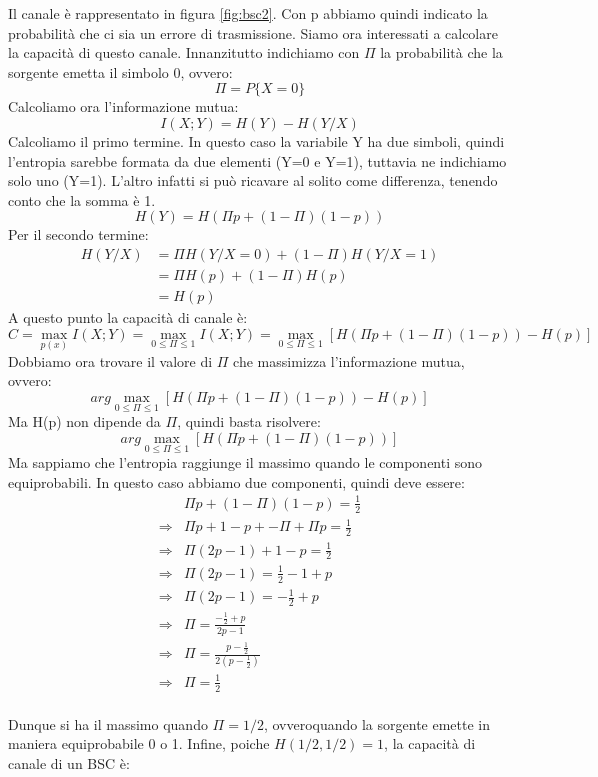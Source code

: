 Il canale è rappresentato in figura \ref{fig:bsc2}. Con p abbiamo quindi indicato la probabilità che ci sia un errore di trasmissione.
Siamo ora interessati a calcolare la capacità di questo canale.
Innanzitutto indichiamo con $\Pi$ la probabilità che la sorgente emetta il simbolo 0, ovvero:
\[
 \Pi=P\{X=0\}
\]
Calcoliamo ora l'informazione mutua:
\[
 I(X;Y)=H(Y)-H(Y/X)
\]
Calcoliamo il primo termine. In questo caso la variabile Y ha due simboli, quindi l'entropia 
sarebbe formata da due elementi (Y=0 e Y=1), tuttavia ne indichiamo solo uno (Y=1). L'altro infatti si può ricavare 
al solito come differenza, tenendo conto che la somma è 1. 
\[
 H(Y)=H(\Pi p + (1-\Pi)(1-p))
\]
Per il secondo termine:
\[\begin{split}
 H(Y/X)&=\Pi H(Y/X=0) + (1-\Pi) H(Y/X=1) \\
       &=\Pi H(p) + (1-\Pi) H(p) \\
       &=H(p)
  \end{split}
\]
A questo punto la capacità di canale è:
\[
 C=\max_{p(x)} I(X;Y)=\max_{0 \le \Pi \le 1} I(X;Y)=\max_{0 \le \Pi \le 1} [ H(\Pi p + (1-\Pi)(1-p)) - H(p) ]
\]
Dobbiamo ora trovare il valore di $\Pi$ che massimizza l'informazione mutua, ovvero:
\[
 arg \max_{0 \le \Pi \le 1} [ H(\Pi p + (1-\Pi)(1-p)) - H(p) ]
\]
Ma H(p) non dipende da $\Pi$, quindi basta risolvere:
\[
 arg \max_{0 \le \Pi \le 1} [ H(\Pi p + (1-\Pi)(1-p))]
\]
Ma sappiamo che l'entropia raggiunge il massimo quando le componenti sono equiprobabili.
In questo caso abbiamo due componenti, quindi deve essere:
\[\begin{split}
 &\Pi p + (1-\Pi)(1-p)=\frac{1}{2} \\
 \Rightarrow &\Pi p + 1-p + -\Pi +\Pi p=\frac{1}{2} \\ 
 \Rightarrow &\Pi(2p-1) + 1-p =\frac{1}{2} \\ 
 \Rightarrow &\Pi(2p-1) =\frac{1}{2}-1+p \\ 
 \Rightarrow &\Pi(2p-1) =-\frac{1}{2}+p \\
 \Rightarrow &\Pi=\frac{-\frac{1}{2}+p}{2p-1} \\  
 \Rightarrow &\Pi=\frac{p-\frac{1}{2}}{2(p-\frac{1}{2})} \\
 \Rightarrow &\Pi=\frac{1}{2} \\
  \end{split}
\]

\noindent
Dunque si ha il massimo quando $\Pi=1/2$, ovveroquando la sorgente emette in maniera equiprobabile 0 o 1.
Infine, poiche $H(1/2,1/2)=1$, la capacità di canale di un BSC è:

